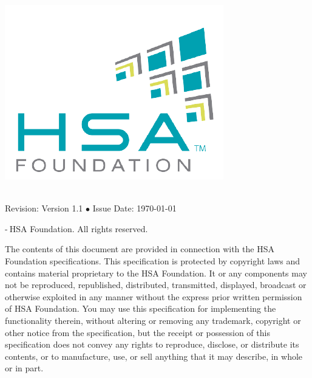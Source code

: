 \documentclass[oneside]{book}
\newcommand{\doctitle}{HSA Runtime Programmer's Reference Manual}
\begin{document}
\providecommand{\DIFadd}[1]{{\protect\color{Green}#1}}
\renewcommand{\DIFadd}[1]{{\protect\color{Green}#1}}

\providecommand{\DIFdel}[1]{{\protect\color{red}\sout{\mbox{#1}}}}
\renewcommand{\DIFdel}[1]{{\protect\color{red}\sout{\mbox{#1}}}}


\begin{titlepage}
\includegraphics[width=.3\textwidth]{fig/foundation.png}
\vspace*{7cm}
\begin{center}
{\Huge \color{Cerulean}{\doctitle}\\[7cm]}
{\small Revision: Version 1.1 $\bullet$ Issue Date: \today}\\ %
\end{center}
\end{titlepage}
\thispagestyle{empty} {-\the\year $\:$HSA Foundation. All rights
  reserved.}


The contents of this document are provided in connection with the HSA Foundation
specifications. This specification is protected by copyright laws and contains
material proprietary to the HSA Foundation. It or any components may not be
reproduced, republished, distributed, transmitted, displayed, broadcast or
otherwise exploited in any manner without the express prior written permission
of HSA Foundation. You may use this specification for implementing the
functionality therein, without altering or removing any trademark, copyright or
other notice from the specification, but the receipt or possession of this
specification does not convey any rights to reproduce, disclose, or distribute
its contents, or to manufacture, use, or sell anything that it may describe, in
whole or in part.
\end{document}
